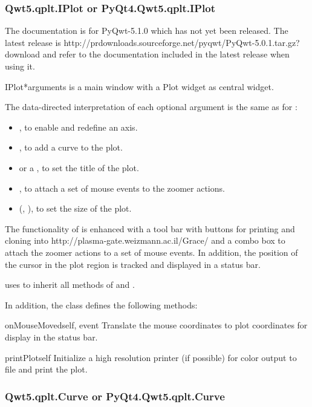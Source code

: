 \documentclass{manual}
\newcommand{\Grace}{\ulink{Grace}
  {http://plasma-gate.weizmann.ac.il/Grace/}}
\newcommand{\PyQwtLatestTarGz}{\ulink{PyQwt-5.0.1.tar.gz}
  {http://prdownloads.sourceforge.net/pyqwt/PyQwt-5.0.1.tar.gz?download}}
\newcommand{\Future}{
  \begin{notice}[warning]
    The documentation is for PyQwt-5.1.0 which has not yet been released. The
    latest release is \PyQwtLatestTarGz{} and refer to the documentation
    included in the latest release when using it.
  \end{notice}
}
\begin{document}
\subsubsection{Qwt5.qplt.IPlot or PyQt4.Qwt5.qplt.IPlot \label{intro-qplt-iplot}}

\Future{}

\begin{classdesc}{IPlot}{*arguments}
   is a main window with a Plot widget as central widget.

  The data-directed interpretation of each optional argument is the
  same as for :
  \begin{itemize}
  \item
    , to enable and redefine an axis.
  \item
    , to add a curve to the plot.
  \item
     or a , to set the title of the plot.
  \item
    , to attach a set of mouse events to the zoomer actions.
  \item
    (, ), to set the size of the plot.
  \end{itemize}

  The functionality of  is enhanced with a tool bar with
  buttons for printing and cloning into \Grace{} and a combo box to attach
  the zoomer actions to a set of mouse events.
  In addition, the position of the cursor in the plot region is tracked
  and displayed in a status bar. 

   uses  to inherit all methods of
   and .


In addition, the class  defines the following methods:

\begin{methoddesc}[Plot]{onMouseMoved}{self, event}
Translate the mouse coordinates to plot coordinates for display in the status
bar.
\end{methoddesc}

\begin{methoddesc}[IPlot]{printPlot}{self}
Initialize a high resolution printer (if possible) for color output to file and
print the plot.
\end{methoddesc}

\end{classdesc}

\subsubsection{Qwt5.qplt.Curve or PyQt4.Qwt5.qplt.Curve \label{intro-qplt-curve}}
\end{document}
